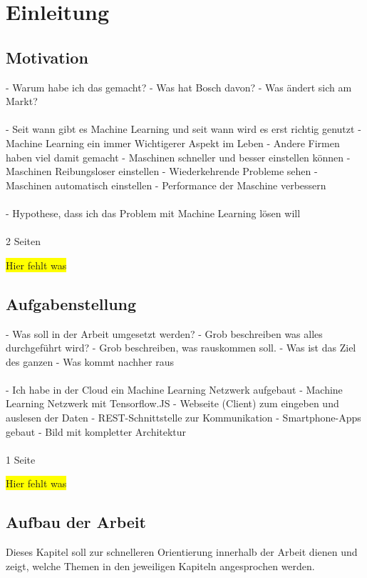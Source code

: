 \chapter{Einleitung}
\label{ch:einleitung}

\section{Motivation}
\label{sec:motivation}
- Warum habe ich das gemacht?
- Was hat Bosch davon?
- Was ändert sich am Markt?
\\ \\
- Seit wann gibt es Machine Learning und seit wann wird es erst richtig genutzt
- Machine Learning ein immer Wichtigerer Aspekt im Leben
- Andere Firmen haben viel damit gemacht
- Maschinen schneller und besser einstellen können
- Maschinen Reibungsloser einstellen
- Wiederkehrende Probleme sehen
- Maschinen automatisch einstellen
- Performance der Maschine verbessern
\\ \\
- Hypothese, dass ich das Problem mit Machine Learning lösen will
\\ \\
2 Seiten

\colorbox{yellow}{Hier fehlt was}

\section{Aufgabenstellung}
\label{sec:aufgabenstellung}
- Was soll in der Arbeit umgesetzt werden?
- Grob beschreiben was alles durchgeführt wird?
- Grob beschreiben, was rauskommen soll.
- Was ist das Ziel des ganzen
- Was kommt nachher raus
\\ \\
- Ich habe in der Cloud ein Machine Learning Netzwerk aufgebaut
- Machine Learning Netzwerk mit Tensorflow.JS
- Webseite (Client) zum eingeben und auslesen der Daten
- REST-Schnittstelle zur Kommunikation
- Smartphone-Apps gebaut
- Bild mit kompletter Architektur
\\ \\
1 Seite

\colorbox{yellow}{Hier fehlt was}

\newpage

\section{Aufbau der Arbeit}
\label{sec:aufbauDerArbeit}
Dieses Kapitel soll zur schnelleren Orientierung innerhalb der Arbeit dienen und zeigt, welche Themen in den jeweiligen
Kapiteln angesprochen werden.

